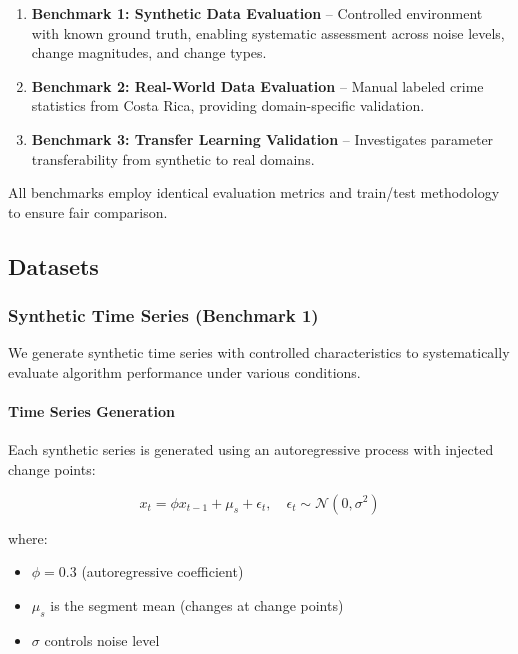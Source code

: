 \documentclass[journal,article,submit,pdftex,moreauthors]{Definitions/mdpi}
\begin{document}
\begin{enumerate}
    \item \textbf{Benchmark 1: Synthetic Data Evaluation} -- Controlled environment with known ground truth, enabling systematic assessment across noise levels, change magnitudes, and change types.
    \item \textbf{Benchmark 2: Real-World Data Evaluation} -- Manual labeled crime statistics from Costa Rica, providing domain-specific validation.
    \item \textbf{Benchmark 3: Transfer Learning Validation} -- Investigates parameter transferability from synthetic to real domains.
\end{enumerate}

All benchmarks employ identical evaluation metrics and train/test methodology to ensure fair comparison.

\subsection{Datasets}

\subsubsection{Synthetic Time Series (Benchmark 1)}
\label{sec:synthetic_data}

We generate synthetic time series with controlled characteristics to systematically evaluate algorithm performance under various conditions.

\paragraph{Time Series Generation}

Each synthetic series is generated using an autoregressive process with injected change points:

\begin{equation}
x_t = \phi x_{t-1} + \mu_s + \epsilon_t, \quad \epsilon_t \sim \mathcal{N}(0, \sigma^2)
\end{equation}

where:
\begin{itemize}
    \item $\phi = 0.3$ (autoregressive coefficient)
    \item $\mu_s$ is the segment mean (changes at change points)
    \item $\sigma$ controls noise level
\end{itemize}
\end{document}
